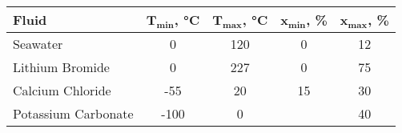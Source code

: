 \begin{tabular}{|p{10em} c c c c |}
    \hline
    \rowcolor{bluepoli!40} %
    \textbf{Fluid}& \(\mathbf{T_{min}}\)\textbf{, \unit{\degreeCelsius}} & \(\mathbf{T_{max}}\)\textbf{, \unit{\degreeCelsius}} & \(\mathbf{x_{min}}\)\textbf{, \unit{\percent}} & \(\mathbf{x_{max}}\)\textbf{, \unit{\percent}}\T\B \\
    \hline \hline
    Seawater & 0 & 120 & 0 & 12 \T\B\\
    Lithium Bromide & 0 & 227 & 0 & 75 \T\B \\
    Calcium Chloride & -55 & 20 & 15 & 30 \T\B\\
    Potassium Carbonate & -100 & 0 &  & 40 \B\\
    \hline
\end{tabular}